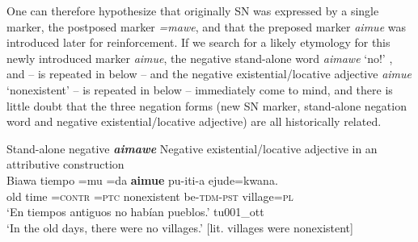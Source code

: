 \documentclass[output=paper]{langsci/langscibook}
\begin{document}
One can therefore hypothesize that originally SN was expressed by a
single marker, the postposed marker \textit{=mawe}, and that the preposed
marker \textit{aimue} was introduced later for reinforcement. If we search
for a likely etymology for this newly introduced marker \textit{aimue}, the
negative stand-alone word \textit{aimawe} `no!'
,  and
 --  is repeated in
 below -- and the negative
existential\slash locative adjective \textit{aimue} `nonexistent'
 –  is repeated in
 below – immediately come to mind, and there is little doubt that the three negation forms (new SN marker, stand-alone negation word and negative existential\slash locative adjective) are all historically related.
%
\begin{exe}\ex
\label{ex:tacana-standalone-negative}  Stand-alone negative
\textbf{\textit{aimawe}}
%
\ex\label{ex:tacana-negexadj} Negative existential\slash locative adjective
in an attributive construction\\
\gll {\ob}Biawa tiempo{\cb} =mu =da \textbf{aimue} pu-iti-a ejude=kwana.\\
    old  time  =\textsc{contr}  \textsc{=ptc}  nonexistent
    be-\textsc{tdm-pst}  village=\textsc{pl}\\
\glt `En tiempos antiguos no habían pueblos.' tu001\_ott\\
`In the old days, there were no villages.' [lit. villages were nonexistent]
\end{exe}
\end{document}
